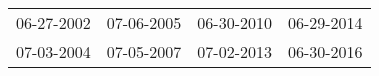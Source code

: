 \begin{supertabular}{llll}
 06-27-2002 &  07-06-2005 &  06-30-2010 &  06-29-2014 \\
 07-03-2004 &  07-05-2007 &  07-02-2013 &  06-30-2016 \\
\end{supertabular}
